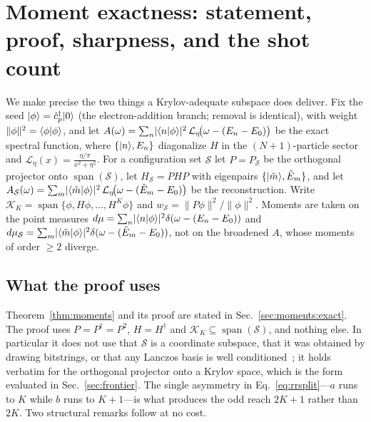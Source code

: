 

\section{Moment exactness: statement, proof, sharpness, and the shot count}
\label{app:moments}

We make precise the two things a Krylov-adequate subspace does deliver. Fix the seed
$\lvert \phi \rangle=\hat c^{\dagger}_{p}\lvert 0 \rangle$ (the electron-addition branch; removal is identical), with
weight $\lVert\phi\rVert^{2}=\langle \phi|\phi \rangle$, and let
$A(\omega)=\sum_{n}\lvert\langle n|\phi \rangle\rvert^{2}\,\mathcal L_{\eta}\!\big(\omega-(E_n-E_0)\big)$ be
the exact spectral function, where $\{\lvert n \rangle,E_n\}$ diagonalize $H$ in the $(N{+}1)$-particle sector
and $\mathcal L_{\eta}(x)=\tfrac{\eta/\pi}{x^{2}+\eta^{2}}$. For a configuration set $\mathcal S$ let
$P=P_{\mathcal S}$ be the orthogonal projector onto $\operatorname{span}(\mathcal S)$, let
$H_{\mathcal S}=PHP$ with eigenpairs $\{\lvert \tilde m \rangle,\tilde E_m\}$, and let
$A_{\mathcal S}(\omega)=\sum_{m}\lvert\langle \tilde m|\phi \rangle\rvert^{2}\,
\mathcal L_{\eta}\!\big(\omega-(\tilde E_m-E_0)\big)$ be the reconstruction. Write
$\mathcal K_K=\operatorname{span}\{\phi,H\phi,\dots,H^{K}\phi\}$ and
$w_{\mathcal S}=\lVert P\phi\rVert^{2}/\lVert\phi\rVert^{2}$. Moments are taken on the point measures
$d\mu=\sum_n\lvert\langle n|\phi \rangle\rvert^{2}\delta(\omega-(E_n-E_0))$ and
$d\mu_{\mathcal S}=\sum_m\lvert\langle \tilde m|\phi \rangle\rvert^{2}\delta(\omega-(\tilde E_m-E_0))$, not on
the broadened $A$, whose moments of order $\ge2$ diverge.

\subsection{What the proof uses}
\label{app:moments:exact}

Theorem~\ref{thm:moments} and its proof are stated in Sec.~\ref{sec:moments:exact}. The proof uses
$P=P^{\dagger}=P^{2}$, $H=H^{\dagger}$ and $\mathcal K_K\subseteq\operatorname{span}(\mathcal S)$, and
nothing else. In particular it does not use that $\mathcal S$ is a coordinate subspace, that it was
obtained by drawing bitstrings, or that any Lanczos basis is well
conditioned~\cite{epperly2022}; it holds verbatim for
the orthogonal projector onto a Krylov space, which is the form evaluated in Sec.~\ref{sec:frontier}.
The single asymmetry in Eq.~\eqref{eq:rrsplit}---$a$ runs to $K$ while $b$ runs to $K+1$---is what
produces the odd reach $2K+1$ rather than $2K$. Two structural remarks follow at no cost.

